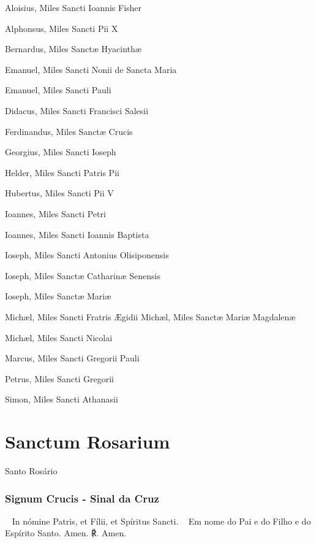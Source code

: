 \begin{paracol}{2}
\small{
Aloisius, Miles Sancti Ioannis Fisher

Alphonsus, Miles Sancti Pii X

Bernardus, Miles Sanctæ Hyacinthæ

Emanuel, Miles Sancti Nonii de Sancta Maria

Emanuel, Miles Sancti Pauli

Didacus, Miles Sancti Francisci Salesii

Ferdinandus, Miles Sanctæ Crucis

Georgius, Miles Sancti Ioseph

Helder, Miles Sancti Patris Pii

Hubertus, Miles Sancti Pii V

Ioannes, Miles Sancti Petri

Ioannes, Miles Sancti Ioannis Baptista

Ioseph, Miles Sancti Antonius Olisiponensis

Ioseph, Miles Sanctæ Catharinæ Senensis

Ioseph, Miles Sanctæ Mariæ

Michæl, Miles Sancti Fratris Ægidii
\switchcolumn
Michæl, Miles Sanctæ Mariæ Magdalenæ

Michæl, Miles Sancti Nicolai

Marcus, Miles Sancti Gregorii Pauli

Petrus, Miles Sancti Gregorii

Simon, Miles Sancti Athanasii
}
\end{paracol}

\newpage

\section{Sanctum Rosarium}

\begin{nscenter}Santo Rosário\end{nscenter}

\emph{}

\subsubsection{Signum Crucis - Sinal da Cruz}
\begin{paracol}{2}
{\redx ~} In nómine Patris, et Fílii, et Spíritus Sancti.
\switchcolumn
{\redx ~} Em nome do Pai e do Filho e do Espírito Santo.
 Amen.
\switchcolumn
{\redx ℟.} Amen.
\end{paracol}

